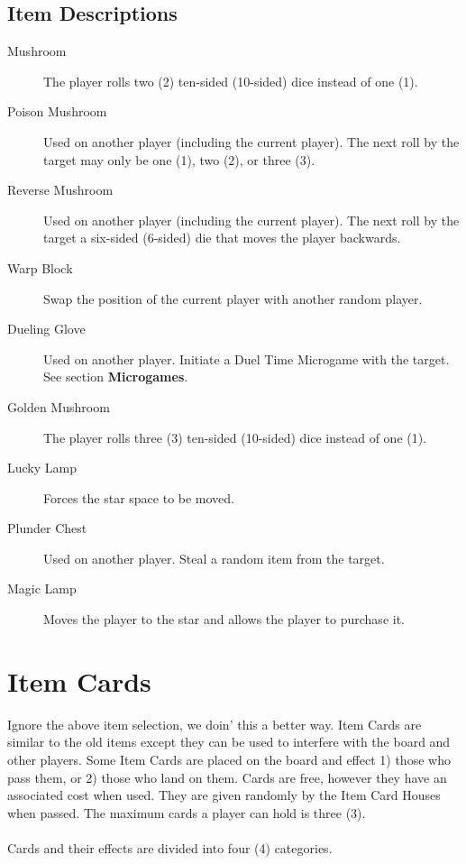 \documentclass{article}
\begin{document}
\subsection{Item Descriptions}
\begin{description}
\item[Mushroom] The player rolls two (2) ten-sided (10-sided) dice instead
of one (1).

\item[Poison Mushroom] Used on another player (including the current player).
The next roll by the target may only be one (1), two (2), or three (3).

\item[Reverse Mushroom] Used on another player (including the current player).
The next roll by the target a six-sided (6-sided) die that moves the player backwards.

\item[Warp Block] Swap the position of the current player with another random player.

\item[Dueling Glove] Used on another player. Initiate a Duel Time Microgame with the target.
See section \textbf{Microgames}.

\item[Golden Mushroom] The player rolls three (3) ten-sided (10-sided) dice instead
of one (1).

\item[Lucky Lamp] Forces the star space to be moved.

\item[Plunder Chest] Used on another player. Steal a random item from the target.

\item[Magic Lamp] Moves the player to the star and allows the player to purchase it.
\end{description}

\section{Item Cards}

Ignore the above item selection, we doin' this a better way.  Item Cards are similar
to the old items except they can be used to interfere with the board and other players.
Some Item Cards are placed on the board and effect 1) those who pass them, or 2)
those who land on them.  Cards are free, however they have an associated cost when
used.  They are given randomly by the Item Card Houses when passed.  The maximum
cards a player can hold is three (3).
\\\\
\noindent
Cards and their effects are divided into four (4) categories.
\end{document}
